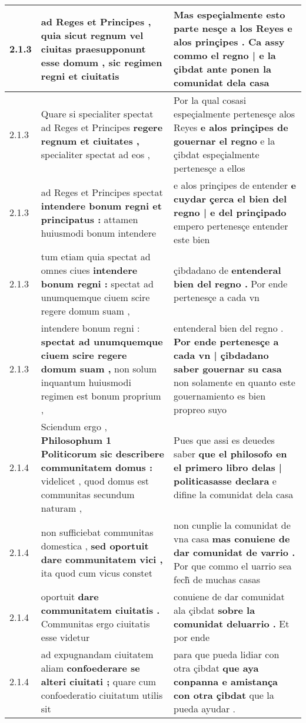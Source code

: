 \begin{tabular}{|p{1cm}|p{6.5cm}|p{6.5cm}|}
2.1.3 & ad Reges et Principes , \textbf{ quia sicut regnum vel ciuitas praesupponunt esse domum , } sic regimen regni et ciuitatis & Mas espeçialmente esto parte nesçe a los Reyes e alos prinçipes . \textbf{ Ca assy commo el regno | e la çibdat } ante ponen la comunidat dela casa \\\hline
2.1.3 & Quare si specialiter spectat ad Reges et Principes \textbf{ regere regnum et ciuitates , } specialiter spectat ad eos , & Por la qual cosasi espeçialmente pertenesçe alos Reyes \textbf{ e alos prinçipes de gouernar el regno } e la çibdat espeçialmente pertenesçe a ellos \\\hline
2.1.3 & ad Reges et Principes spectat \textbf{ intendere bonum regni et principatus : } attamen huiusmodi bonum intendere & e alos prinçipes de entender \textbf{ e cuydar çerca el bien del regno | e del prinçipado } empero pertenesçe entender este bien \\\hline
2.1.3 & tum etiam quia spectat ad omnes ciues \textbf{ intendere bonum regni : } spectat ad unumquemque ciuem scire regere domum suam , & çibdadano de \textbf{ entenderal bien del regno . } Por ende pertenesçe a cada vn \\\hline
2.1.3 & intendere bonum regni : \textbf{ spectat ad unumquemque ciuem scire regere domum suam , } non solum inquantum huiusmodi regimen est bonum proprium , & entenderal bien del regno . \textbf{ Por ende pertenesçe a cada vn | çibdadano saber gouernar su casa } non solamente en quanto este gouernamiento es bien propreo suyo \\\hline
2.1.4 & Sciendum ergo , \textbf{ Philosophum 1 Politicorum sic describere communitatem domus : } videlicet , quod domus est communitas secundum naturam , & Pues que assi es deuedes saber \textbf{ que el philosofo en el primero libro delas | politicasasse declara } e difine la comunidat dela casa \\\hline
2.1.4 & non sufficiebat communitas domestica , \textbf{ sed oportuit dare communitatem vici , } ita quod cum vicus constet & non cunplie la comunidat de vna casa \textbf{ mas conuiene de dar comunidat de varrio . } Por que commo el uarrio sea fech̃ de muchas casas \\\hline
2.1.4 & oportuit \textbf{ dare communitatem ciuitatis . } Communitas ergo ciuitatis esse videtur & conuiene de dar comunidat ala çibdat \textbf{ sobre la comunidat deluarrio . } Et por ende \\\hline
2.1.4 & ad expugnandam ciuitatem aliam \textbf{ confoederare se alteri ciuitati ; } quare cum confoederatio ciuitatum utilis sit & para que pueda lidiar con otra çibdat \textbf{ que aya conpanna e amistança con otra çibdat } que la pueda ayudar . \\\hline

\end{tabular}
